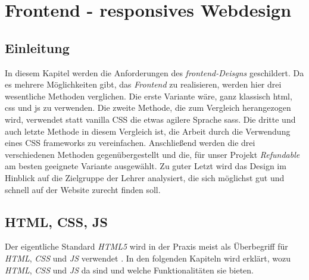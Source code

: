 
\section{Frontend - responsives Webdesign}
\label{chapter:study-frontend}
	\subsection{Einleitung}
	\label{chapter:study-frontend-einleitung}
	In diesem Kapitel werden die Anforderungen des \textit{\Gls{frontend}-Deisgns} geschildert. Da es mehrere Möglichkeiten gibt, das \textit{Frontend} zu realisieren, werden hier drei wesentliche Methoden verglichen. Die erste Variante wäre, ganz klassisch \Gls{html}, \Gls{css} und \Gls{js} zu verwenden. Die zweite Methode, die zum Vergleich herangezogen wird, verwendet statt \Gls{vanilla} CSS die etwas agilere Sprache \Gls{sass}. Die dritte und auch letzte Methode in diesem Vergleich ist, die Arbeit durch die Verwendung eines CSS \Gls{framework}s zu vereinfachen. Anschließend werden die drei verschiedenen Methoden gegenübergestellt und die, für unser Projekt \textit{Refundable} am besten geeignete Variante ausgewählt. Zu guter Letzt wird das Design im Hinblick auf die Zielgruppe der Lehrer analysiert, die sich möglichst gut und schnell auf der Website zurecht finden soll.
	
	\subsection{HTML, CSS, JS}
	\label{chapter:study-frontend-html-css-js}
	Der eigentliche Standard \textit{HTML5} wird in der Praxis meist als Überbegriff für \textit{HTML}, \textit{CSS} und \textit{JS} verwendet \cite{html5-css3-handbuch}. In den folgenden Kapiteln wird erklärt, wozu \textit{HTML}, \textit{CSS} und \textit{JS} da sind und welche Funktionalitäten sie bieten.
	
